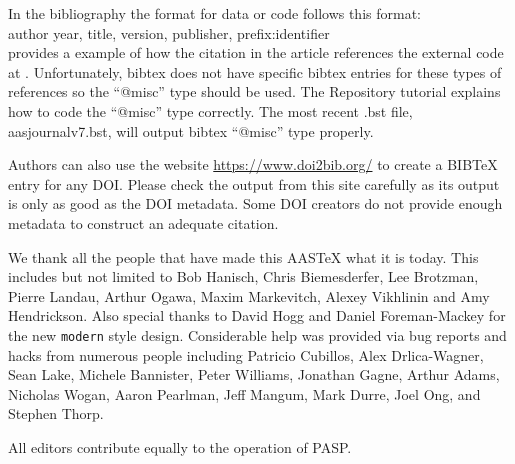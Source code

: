 \documentclass[linenumbers,trackchanges]{aastex701}
\begin{document}
In the bibliography the format for data or code follows this format: \\

\noindent author year, title, version, publisher, prefix:identifier\\

\citet{2015ApJ...805...23C} provides a example of how the citation in the
article references the external code at
.  Unfortunately, bibtex does
not have specific bibtex entries for these types of references so the
``@misc'' type should be used.  The Repository tutorial explains how to
code the ``@misc'' type correctly.  The most recent .bst file, aasjournalv7.bst, will output bibtex ``@misc'' type properly.

Authors can also use the website \url{https://www.doi2bib.org/} to create a BIBTeX entry for any DOI. Please check the output from this site carefully as its output is only as good as the DOI metadata. Some DOI creators do not provide enough metadata to construct an adequate citation.

\begin{acknowledgments}
We thank all the people that have made this AASTeX what it is today.  This
includes but not limited to Bob Hanisch, Chris Biemesderfer, Lee Brotzman,
Pierre Landau, Arthur Ogawa, Maxim Markevitch, Alexey Vikhlinin and Amy
Hendrickson. Also special thanks to David Hogg and Daniel Foreman-Mackey
for the new {\tt\string modern} style design. Considerable help was provided via bug
reports and hacks from numerous people including Patricio Cubillos, Alex
Drlica-Wagner, Sean Lake, Michele Bannister, Peter Williams, Jonathan
Gagne, Arthur Adams, Nicholas Wogan, Aaron Pearlman, Jeff Mangum, Mark Durre, Joel Ong, and Stephen Thorp.
\end{acknowledgments}

\begin{contribution}

All editors contribute equally to the operation of PASP.


\end{contribution}
\end{document}

